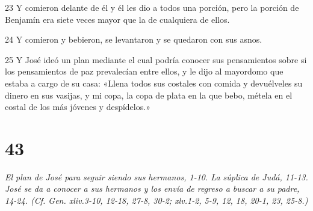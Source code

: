 \par 23 Y comieron delante de él y él les dio a todos una porción, pero la porción de Benjamín era siete veces mayor que la de cualquiera de ellos.
\par 24 Y comieron y bebieron, se levantaron y se quedaron con sus asnos.
\par 25 Y José ideó un plan mediante el cual podría conocer sus pensamientos sobre si los pensamientos de paz prevalecían entre ellos, y le dijo al mayordomo que estaba a cargo de su casa: «Llena todos sus costales con comida y devuélveles su dinero en sus vasijas, y mi copa, la copa de plata en la que bebo, métela en el costal de los más jóvenes y despídelos.»

\chapter{43}

\par \textit{El plan de José para seguir siendo sus hermanos, 1-10. La súplica de Judá, 11-13. José se da a conocer a sus hermanos y los envía de regreso a buscar a su padre, 14-24. (Cf. Gen. xliv.3-10, 12-18, 27-8, 30-2; xlv.1-2, 5-9, 12, 18, 20-1, 23, 25-8.)}

